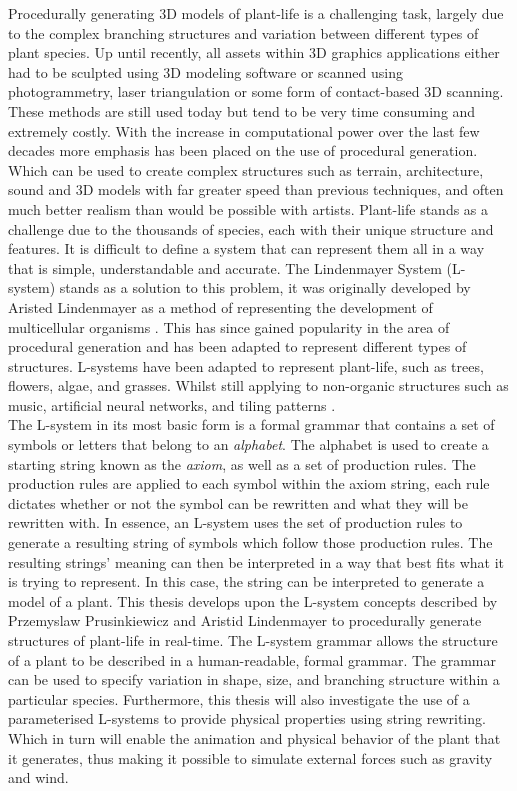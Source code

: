 
\lettrine[lines=3]{P}{}rocedurally generating 3D models of plant-life is a challenging task, largely due to the complex branching structures and variation between different types of plant species. Up until recently, all assets within 3D graphics applications either had to be sculpted using 3D modeling software or scanned using photogrammetry, laser triangulation or some form of contact-based 3D scanning. These methods are still used today but tend to be very time consuming and extremely costly. With the increase in computational power over the last few decades more emphasis has been placed on the use of procedural generation. Which can be used to create complex structures such as terrain, architecture, sound and 3D models with far greater speed than previous techniques, and often much better realism than would be possible with artists. Plant-life stands as a challenge due to the thousands of species, each with their unique structure and features. It is difficult to define a system that can represent them all in a way that is simple, understandable and accurate. The Lindenmayer System (L-system) stands as a solution to this problem, it was originally developed by Aristed Lindenmayer as a method of representing the development of multicellular organisms \cite{lindenmayer1968mathematical}. This has since gained popularity in the area of procedural generation and has been adapted to represent different types of structures. L-systems have been adapted to represent plant-life, such as trees, flowers, algae, and grasses. Whilst still applying to non-organic structures such as music, artificial neural networks, and tiling patterns \cite{Prusinkiewicz1989}.\\

The L-system in its most basic form is a formal grammar that contains a set of symbols or letters that belong to an \textit{alphabet}. The alphabet is used to create a starting string known as the \textit{axiom}, as well as a set of production rules. The production rules are applied to each symbol within the axiom string, each rule dictates whether or not the symbol can be rewritten and what they will be rewritten with. In essence, an L-system uses the set of production rules to generate a resulting string of symbols which follow those production rules. The resulting strings' meaning can then be interpreted in a way that best fits what it is trying to represent. In this case, the string can be interpreted to generate a model of a plant. This thesis develops upon the L-system concepts described by Przemyslaw Prusinkiewicz and Aristid Lindenmayer to procedurally generate structures of plant-life in real-time. The L-system grammar allows the structure of a plant to be described in a human-readable, formal grammar. The grammar can be used to specify variation in shape, size, and branching structure within a particular species. Furthermore, this thesis will also investigate the use of a parameterised L-systems to provide physical properties using string rewriting. Which in turn will enable the animation and physical behavior of the plant that it generates, thus making it possible to simulate external forces such as gravity and wind.\\

